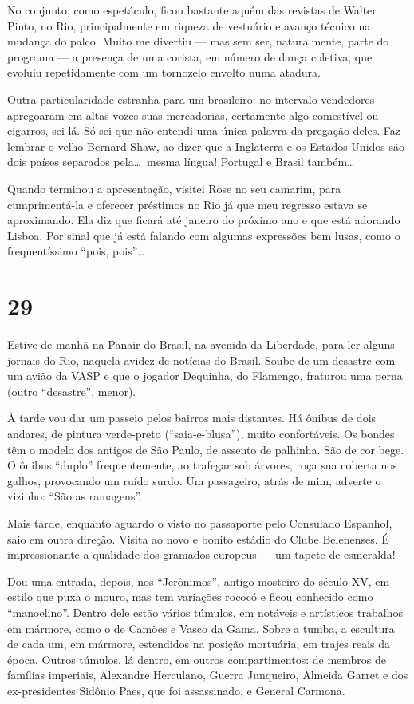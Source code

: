No conjunto, como espetáculo, ficou bastante aquém das revistas de Walter Pinto, no Rio, principalmente em riqueza de vestuário e avanço técnico na mudança do palco. Muito me divertiu --- mas sem ser, naturalmente, parte do programa --- a presença de uma corista, em número de dança coletiva, que evoluiu repetidamente com um tornozelo envolto numa atadura.

Outra particularidade estranha para um brasileiro: no intervalo vendedores apregoaram em altas vozes suas mercadorias, certamente algo comestível ou cigarros, sei lá. Só sei que não entendi uma única palavra da pregação deles. Faz lembrar o velho Bernard Shaw, ao dizer que a Inglaterra e os Estados Unidos são dois países separados pela\ldots\ mesma língua! Portugal e Brasil também\ldots

Quando terminou a apresentação, visitei Rose no seu camarim, para cumprimentá-la e oferecer préstimos no Rio já que meu regresso estava se aproximando. Ela diz que ficará até janeiro do próximo ano e que está adorando Lisboa. Por sinal que já está falando com algumas expressões bem lusas, como o frequentíssimo ``pois, pois''\ldots

\section*{29 \adfflatleafright {}}
Estive de manhã na Panair do Brasil, na avenida da Liberdade, para ler alguns jornais do Rio, naquela avidez de notícias do Brasil. Soube de um desastre com um avião da VASP e que o jogador Dequinha, do Flamengo, fraturou uma perna (outro ``desastre'', menor).

À tarde vou dar um passeio pelos bairros mais distantes. Há ônibus de dois andares, de pintura verde-preto (``saia-e-blusa''), muito confortáveis. Os bondes têm o modelo dos antigos de São Paulo, de assento de palhinha. São de cor bege. O ônibus ``duplo'' frequentemente, ao trafegar sob árvores, roça sua coberta nos galhos, provocando um ruído surdo. Um passageiro, atrás de mim, adverte o vizinho: ``São as ramagens''.

Mais tarde, enquanto aguardo o visto no passaporte pelo Consulado Espanhol, saio em outra direção. Visita ao novo e bonito estádio do Clube Belenenses. É impressionante a qualidade dos gramados europeus --- um tapete de esmeralda!

Dou uma entrada, depois, nos ``Jerônimos'', antigo mosteiro do século XV, em estilo que puxa o mouro, mas tem variações rococó e ficou conhecido como ``manoelino''. Dentro dele estão vários túmulos, em notáveis e artísticos trabalhos em mármore, como o de Camões e Vasco da Gama. Sobre a tumba, a escultura de cada um, em mármore, estendidos na posição mortuária, em trajes reais da época. Outros túmulos, lá dentro, em outros compartimentos: de membros de famílias imperiais, Alexandre Herculano, Guerra Junqueiro, Almeida Garret e dos ex-presidentes Sidônio Paes, que foi assassinado, e General Carmona.

